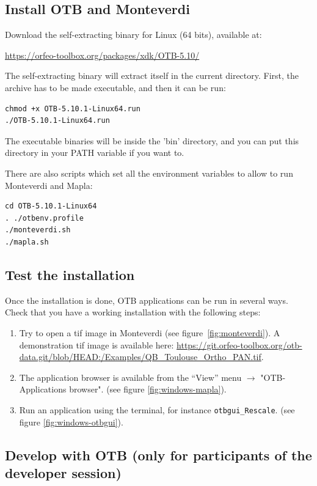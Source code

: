 \documentclass[10pt,a4paper]{article}
\begin{document}
\subsection{Install OTB and Monteverdi}
Download the self-extracting binary for Linux (64 bits), available at:
\begin{center}
\url{https://orfeo-toolbox.org/packages/xdk/OTB-5.10/}
\end{center}

The self-extracting binary will extract itself in the current directory. First, the archive has to be made executable, and then it can be run:
\begin{verbatim}
chmod +x OTB-5.10.1-Linux64.run
./OTB-5.10.1-Linux64.run
\end{verbatim}

The executable binaries will be inside the 'bin' directory, and you can put this directory in your PATH variable if you want to. 

There are also scripts which set all the environment variables to allow to run Monteverdi and Mapla:
\begin{verbatim}
cd OTB-5.10.1-Linux64
. ./otbenv.profile
./monteverdi.sh
./mapla.sh
\end{verbatim}

\subsection{Test the installation}
Once the installation is done, OTB applications can be run in several ways. Check that you have a working installation with the following steps:
\begin{enumerate}

\item Try to open a tif image in Monteverdi (see
figure~\ref{fig:monteverdi}). A demonstration tif image is available here: \url{https://git.orfeo-toolbox.org/otb-data.git/blob/HEAD:/Examples/QB\_Toulouse\_Ortho\_PAN.tif}.

\item The application browser is available from the ``View'' menu 
$\rightarrow$ "OTB-Applications browser".
(see figure \ref{fig:windows-mapla}).

\item Run an application using the terminal, for instance
\texttt{otbgui\_Rescale}. (see figure \ref{fig:windows-otbgui}).

\end{enumerate}

\subsection{Develop with OTB (only for participants of the developer session)}
\end{document}
